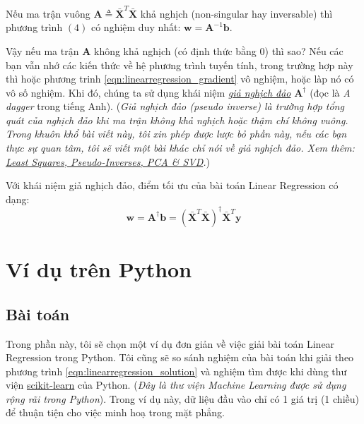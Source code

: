 Nếu ma trận vuông $ \mathbf{A} \triangleq \mathbf{\bar{X}}^T\mathbf{\bar{X}}$ khả nghịch (non-singular hay inversable) thì phương trình $(4)$ có nghiệm duy nhất: $ \mathbf{w} = \mathbf{A}^{-1}\mathbf{b}  $. 
 
Vậy nếu ma trận $\mathbf{A} $ không khả nghịch (có định thức bằng 0) thì sao? Nếu các bạn vẫn nhớ các kiến thức về hệ phương trình tuyến tính, trong trường hợp này thì hoặc phương trinh \eqref{eqn:linearregression_gradient} vô nghiệm, hoặc làp  
nó 
có vô số nghiệm. Khi đó, chúng ta sử dụng khái niệm \href{https://vi.wikipedia.org/wiki/Giả_nghịch_đảo_Moore–Penrose}{\textit{giả nghịch đảo}} $ \mathbf{A}^{\dagger} $ (đọc là \textit{A dagger} trong tiếng Anh). (\textit{Giả nghịch đảo (pseudo inverse) là trường hợp tổng quát của nghịch đảo khi ma trận không khả nghịch hoặc thậm chí không vuông. Trong khuôn khổ bài viết này, tôi xin phép được lược bỏ phần này, nếu các bạn thực sự quan tâm, tôi sẽ viết một bài khác chỉ nói về giả nghịch đảo. Xem thêm: \href{http://www.sci.utah.edu/~gerig/CS6640-F2012/Materials/pseudoinverse-cis61009sl10.pdf}{Least Squares, Pseudo-Inverses, PCA \& SVD}.}) 
 
Với khái niệm giả nghịch đảo, điểm tối ưu của bài toán Linear Regression có dạng: 
\begin{equation}
\label{eqn:linearregression_solution}
\mathbf{w} = \mathbf{A}^{\dagger}\mathbf{b} = (\mathbf{\bar{X}}^T\mathbf{\bar{X}})^{\dagger} \mathbf{\bar{X}}^T\mathbf{y} 
\end{equation} 
 
 
 
\section{Ví dụ trên Python}
 
 
\subsection{Bài toán}
 
Trong phần này, tôi sẽ chọn một ví dụ đơn giản về việc giải bài toán Linear Regression trong Python. Tôi cũng sẽ so sánh nghiệm của bài toán khi giải theo phương trình \eqref{eqn:linearregression_solution} và nghiệm tìm được khi dùng thư viện \href{http://scikit-learn.org/stable/}{scikit-learn} của Python. (\textit{Đây là thư viện Machine Learning được sử dụng rộng rãi trong Python}). Trong ví dụ này, dữ liệu đầu vào chỉ có 1 giá trị (1 chiều) để thuận tiện cho việc minh hoạ trong mặt phẳng.  
 
